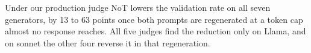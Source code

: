 Under our production judge NoT lowers the validation rate on all seven
generators, by 13 to 63 points once both prompts are regenerated at a token
cap almost no response reaches. All five judges find the reduction only on
Llama, and on sonnet the other four reverse it in that regeneration.

